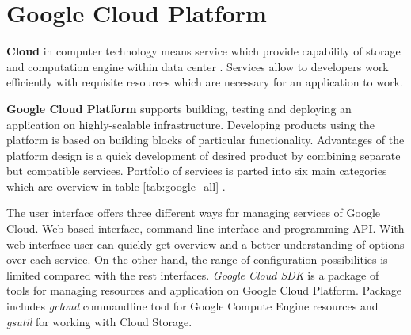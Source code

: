 \documentclass[a4paper,12pt,oneside]{report}
\begin{document}
	
	
	
	\section{Google Cloud Platform}
	\textbf{Cloud} in computer technology means service which provide capability of
	storage and computation engine within data center  . Services allow to developers 
	work efficiently  with 
	requisite resources which are necessary for an application to work.
	
	\textbf{Google Cloud Platform} supports building, testing and deploying an
	application on highly-scalable infrastructure.
	Developing products using the platform is based on building blocks of particular
	functionality. Advantages of  the platform design is a quick development of 
	desired product by combining separate but compatible services. Portfolio of
	services is parted into six main categories 
	which are overview  in
	table \ref{tab:google_all} \cite{gc_product_services}.
	
	The user interface offers three different ways for managing services of Google
	Cloud. Web-based interface, command-line 
	interface and programming API. With web interface 
	user can quickly get overview and a better understanding of 
	options over each service. On the other hand, the range of configuration
	possibilities is limited compared with the rest 
	interfaces. \textit{Google Cloud SDK} is a 
	package of tools for managing resources and application on Google Cloud
	Platform. 
	Package includes \textit{gcloud} commandline tool for Google Compute Engine
	resources and \textit{gsutil} for working with Cloud Storage.
	
\end{document}
